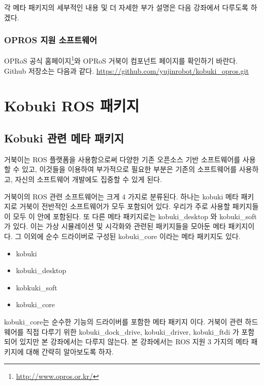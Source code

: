 \vspace{\baselineskip}
\noindent
각 메타 패키지의 세부적인 내용 및 더 자세한 부가 설명은 다음 강좌에서 다루도록 하겠다.

\subsubsection{OPROS 지원 소프트웨어}

OPRoS 공식 홈페이지\footnote{\url{http://www.opros.or.kr/}}와 OPRoS 거북이 컴포넌트 페이지를 확인하기 바란다. Github 저장소는 다음과 같다.
\url{https://github.com/yujinrobot/kobuki_opros.git}

\section{Kobuki ROS 패키지}

\subsection{Kobuki 관련 메타 패키지}

거북이는 ROS 플랫폼을 사용함으로써 다양한 기존 오픈소스 기반 소프트웨어를 사용할 수 있고, 이것들을 이용하여 부가적으로 필요한 부분은 기존의 소프트웨어를 사용하고, 자신의 소프트웨어 개발에도 집중할 수 있게 된다. 

거북이의 ROS 관련 소프트웨어는 크게 4 가지로 분류된다. 하나는 kobuki 메타 패키지로 거북이 전반적인 소프트웨어가 모두 포함되어 있다. 우리가 주로 사용할 패키지들이 모두 이 안에 포함된다. 또 다른 메타 패키지로는 kobuki\_desktop 와 kobuki\_soft 가 있다. 이는 가상 시뮬레이션 및 시각화와 관련된 패키지들을 모아둔 메타 패키지이다. 그 이외에 순수 드라이버로 구성된 kobuki\_core 이라는 메타 패키지도 있다.

\vspace{\baselineskip}
\begin{itemize}[leftmargin=*]
\item kobuki
\item kobuki\_desktop
\item kobkuki\_soft
\item kobuki\_core
\end{itemize}

\vspace{\baselineskip}
\noindent
kobuki\_core는 순수한 기능의 드라이버를 포함한 메타 패키지 이다. 거북이 관련 하드웨어를 직접 다루기 위한 kobuki\_dock\_drive, kobuki\_driver, kobuki\_ftdi 가 포함되어 있지만 본 강좌에서는 다루지 않는다. 본 강좌에서는 ROS 지원 3 가지의 메타 패키지에 대해 간략히 알아보도록 하자.

